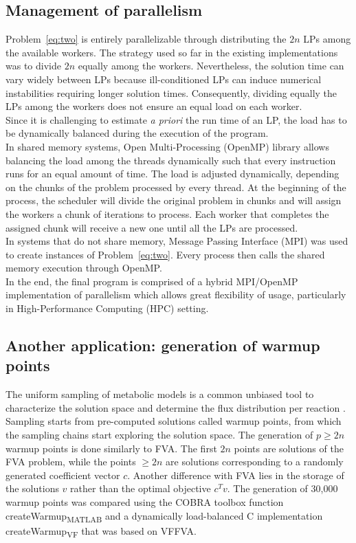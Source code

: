 \subsection*{Management of parallelism}
Problem~\ref{eq:two} is entirely parallelizable through distributing the $2n$ LPs among the available workers. The strategy used so far in the existing implementations was to divide $2n$ equally among the workers. Nevertheless, the solution time can vary widely between LPs because ill-conditioned LPs can induce numerical instabilities requiring longer solution times. Consequently, dividing equally the LPs among the workers does not ensure an equal load on each worker. \\
Since it is challenging to estimate \textit{a priori} the run time of an LP, the load has to be dynamically balanced during the execution of the program.\\
In shared memory systems, Open Multi-Processing (OpenMP) library allows balancing the load among the threads dynamically such that every instruction runs for an equal amount of time. The load is adjusted dynamically, depending on the chunks of the problem processed by every thread. At the beginning of the process, the scheduler will divide the original problem in chunks and will assign the workers a chunk of iterations to process. Each worker that completes the assigned chunk will receive a new one until all the LPs are processed.\\
In systems that do not share memory, Message Passing Interface (MPI) was used to create instances of Problem~\ref{eq:two}. Every process then calls the shared memory execution through OpenMP.\\
In the end, the final program is comprised of a hybrid MPI/OpenMP implementation of parallelism which allows great flexibility of usage, particularly in High-Performance Computing (HPC) setting.
\subsection*{Another application: generation of warmup points}
The uniform sampling of metabolic models is a common unbiased tool to characterize the solution space and determine the flux distribution per reaction \cite{bordel2010sampling,megchelenbrink2014optgpsampler}. Sampling starts from pre-computed solutions called warmup points, from which the sampling chains start exploring the solution space. The generation of $p \geq 2n$ warmup points is done similarly to FVA. The first $2n$ points are solutions of the FVA problem, while the points $\geq 2n$ are solutions corresponding to a randomly generated coefficient vector $c$. Another difference with FVA lies in the storage of the solutions $v$ rather than the optimal objective $c^{T}v$. The generation of 30,000 warmup points was compared using the COBRA toolbox function createWarmup\textsubscript{MATLAB}  and a dynamically load-balanced C implementation createWarmup\textsubscript{VF} that was based on VFFVA.
